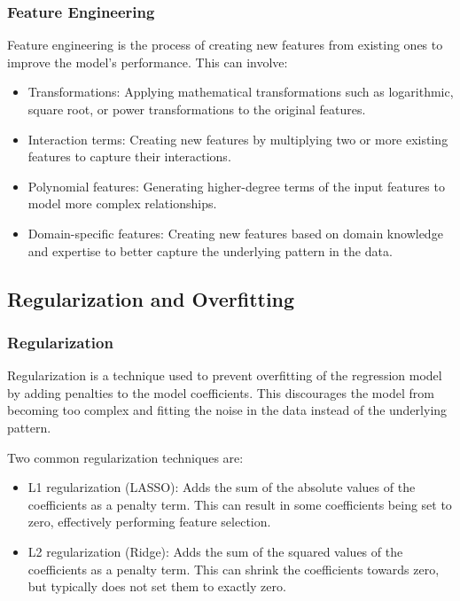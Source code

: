 \documentclass{article}
\begin{document}
\subsubsection{Feature Engineering}
Feature engineering is the process of creating new features from existing ones to improve the model's performance. This can involve:

\begin{itemize}
\item Transformations: Applying mathematical transformations such as logarithmic, square root, or power transformations to the original features.
\item Interaction terms: Creating new features by multiplying two or more existing features to capture their interactions.
\item Polynomial features: Generating higher-degree terms of the input features to model more complex relationships.
\item Domain-specific features: Creating new features based on domain knowledge and expertise to better capture the underlying pattern in the data.
\end{itemize}

\subsection{Regularization and Overfitting}

\subsubsection{Regularization}
Regularization is a technique used to prevent overfitting of the regression model by adding penalties to the model coefficients. This discourages the model from becoming too complex and fitting the noise in the data instead of the underlying pattern.

Two common regularization techniques are:

\begin{itemize}
\item L1 regularization (LASSO): Adds the sum of the absolute values of the coefficients as a penalty term. This can result in some coefficients being set to zero, effectively performing feature selection.
\item L2 regularization (Ridge): Adds the sum of the squared values of the coefficients as a penalty term. This can shrink the coefficients towards zero, but typically does not set them to exactly zero.
\end{itemize}
\end{document}
